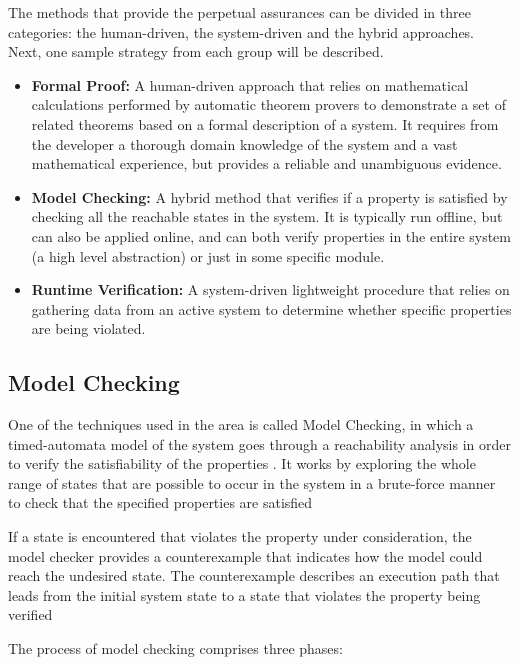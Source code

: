 The methods that provide the perpetual assurances can be divided in three categories: the human-driven, the system-driven and the hybrid approaches. Next, one sample strategy from each group will be described.

\begin{itemize}
    \item \textbf{Formal Proof:} A human-driven approach that relies on mathematical calculations performed by automatic theorem provers to demonstrate a set of related theorems based on a formal description of a system. It requires from the developer a thorough domain knowledge of the system and a vast mathematical experience, but provides a reliable and unambiguous evidence. 
	
	\item \textbf{Model Checking:} A hybrid method that verifies if a property is satisfied by checking all the reachable states in the system. It is typically run offline, but can also be applied online, and can both verify properties in the entire system (a high level abstraction) or just in some specific module.
    
	\item \textbf{Runtime Verification:} A system-driven lightweight procedure that relies on gathering data from an active system to determine whether specific properties are being violated.
    
\end{itemize}


\subsection{Model Checking}

One of the techniques used in the area is called Model Checking, in which a timed-automata model of the system goes through a reachability analysis in order to verify the satisfiability of the properties \cite{2008PrinciplesModelChecking}. It works by exploring the whole range of states that are possible to occur in the system in a brute-force manner to check that the specified properties are satisfied

If a state is encountered that violates the property under consideration, the model checker provides a counterexample that indicates how the model could reach the undesired state. The counterexample describes an execution path that leads from the initial system state to a state that violates the property being verified

The process of model checking comprises three phases: 

